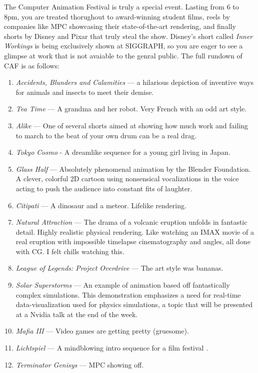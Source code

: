 \documentclass[../main.tex]{subfiles}
\begin{document}
The Computer Animation Festival is truly a special event. Lasting from 6 to 8pm, you are treated thorughout to award-winning student films, reels by companies like MPC showcasing their state-of-the-art rendering, and finally shorts by Disney and Pixar that truly steal the show. Disney's short called \textit{Inner Workings} is being exclusively shown at SIGGRAPH, so you are eager to see a glimpse at work that is not avaiable to the genral public. The full rundown of CAF is as follows:

\begin{enumerate}
	\item \textit{Accidents, Blunders and Calamities} --- a hilarious depiction of inventive ways for animals and insects to meet their demise.
	\item \textit{Tea Time} --- A grandma and her robot. Very French with an odd art style.
	\item \textit{Alike} --- One of several shorts aimed at showing how much work and failing to march to the beat of your own drum can be a real drag. 
	\item \textit{Tokyo Cosmo} - A dreamlike sequence for a young girl living in Japan.
	\item \textit{Glass Half} --- Absolutely phenomenal animation by the Blender Foundation.  A clever, colorful 2D cartoon using nonsensical vocalizations in the voice acting to push the audience into constant fits of laughter.
	\item \textit{Citipati} --- A dinosaur and a meteor. Lifelike rendering.
	\item \textit{Natural Attraction} --- The drama of a volcanic eruption unfolds in fantastic detail. Highly realistic physical rendering. Like watching an IMAX movie of a real eruption with impossible timelapse cinematography and angles, all done with CG. I felt chills watching this.
	\item \textit{League of Legends: Project Overdrive} --- The art style was bananas.
	\item \textit{Solar Superstorms} --- An example of animation based off fantastically complex simulations. This demonstration emphasizes a need for real-time data-visualization used for physics simulations, a topic that will be presented at a Nvidia talk at the end of the week.
	\item \textit{Mafia III} --- Video games are getting pretty (gruesome).
	\item \textit{Lichtspiel} --- A mindblowing intro sequence for a film festival .
	\item \textit{Terminator Genisys} --- MPC showing off.

\end{enumerate}
\end{document}
